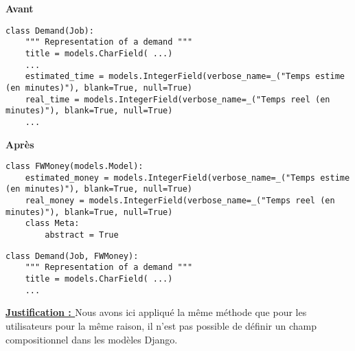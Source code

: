 \begin{minipage}{.5\textwidth}
\begin{center} \textbf{Avant}\end{center}
\begin{lstlisting}
class Demand(Job):
    """ Representation of a demand """
    title = models.CharField( ...)
    ...
    estimated_time = models.IntegerField(verbose_name=_("Temps estime (en minutes)"), blank=True, null=True)
    real_time = models.IntegerField(verbose_name=_("Temps reel (en minutes)"), blank=True, null=True)
    ...
\end{lstlisting} 
\end{minipage}
\hspace{0.3cm}
\begin{minipage}{.5\textwidth}
\begin{center} \textbf{Après}\end{center}
\begin{lstlisting}
class FWMoney(models.Model):
    estimated_money = models.IntegerField(verbose_name=_("Temps estime (en minutes)"), blank=True, null=True)
    real_money = models.IntegerField(verbose_name=_("Temps reel (en minutes)"), blank=True, null=True)
    class Meta:
        abstract = True
\end{lstlisting} 

\begin{lstlisting}
class Demand(Job, FWMoney):
    """ Representation of a demand """
    title = models.CharField( ...)
    ...
\end{lstlisting} 
\end{minipage}

\textbf{\underline{Justification : }} Nous avons ici appliqué la même méthode que pour les utilisateurs pour la même raison,  il n'est pas possible de définir un champ compositionnel dans les modèles Django.  

